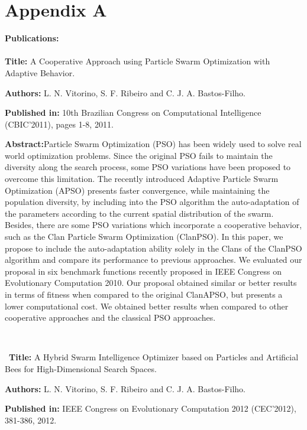 \chapter*{Appendix A}


\textbf{Publications:}
\\
\\


\textbf{Title:} A Cooperative Approach using Particle Swarm Optimization with Adaptive Behavior.

\textbf{Authors:} L. N. Vitorino, S. F. Ribeiro and C. J. A. Bastos-Filho.

\textbf{Published in:} 10th Brazilian Congress on Computational Intelligence (CBIC'2011), pages 1-8, 2011.

\textbf{Abstract:}Particle Swarm Optimization (PSO) has been widely used to solve real world optimization problems. Since the original PSO fails to maintain the diversity along the search process, some PSO variations have been proposed to overcome this limitation. The recently introduced Adaptive Particle Swarm Optimization (APSO) presents faster convergence, while maintaining the population diversity, by including into the PSO algorithm the auto-adaptation of the parameters according to the current spatial distribution of the swarm. Besides, there are some PSO variations which incorporate a cooperative behavior, such as the Clan Particle Swarm Optimization (ClanPSO). In this paper, we propose to include the auto-adaptation ability solely in the Clans of the ClanPSO algorithm and compare its performance to previous approaches. We evaluated our proposal in six benchmark functions recently proposed in IEEE Congress on Evolutionary Computation 2010. Our proposal obtained similar or better results in terms of fitness when compared to the original ClanAPSO, but presents a lower computational cost. We obtained better results when compared to other cooperative approaches and the classical PSO approaches.

\

\
\textbf{Title:} A Hybrid Swarm Intelligence Optimizer based on Particles and Artificial Bees for High-Dimensional Search Spaces.

\textbf{Authors:} L. N. Vitorino, S. F. Ribeiro and C. J. A. Bastos-Filho.

\textbf{Published in:} IEEE Congress on Evolutionary Computation 2012 (CEC'2012), 381-386, 2012.

